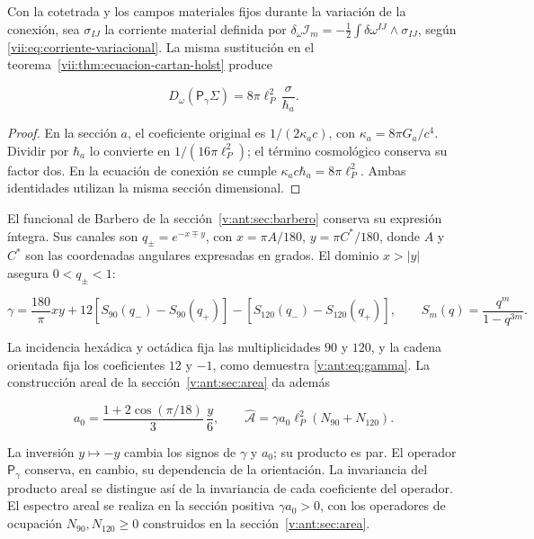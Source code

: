 Con la cotetrada y los campos materiales fijos durante la variación de la conexión, sea \(\sigma_{IJ}\) la corriente material definida por
\(\delta_\omega\mathcal I_m=-\tfrac12\int\delta\omega^{IJ}\wedge\sigma_{IJ}\), según \eqref{vii:eq:corriente-variacional}. La misma sustitución en el teorema~\ref{vii:thm:ecuacion-cartan-holst} produce



\begin{equation}
D_\omega(\mathsf P_\gamma\Sigma)
=8\pi\ell_P^2\,\frac{\sigma}{\hbar_a}.
\label{nuc12:eq:4.3}
\end{equation}



\begin{proof}
En la sección \(a\), el coeficiente original es \(1/(2\kappa_a c)\), con \(\kappa_a=8\pi G_a/c^4\). Dividir por \(\hbar_a\) lo convierte en \(1/(16\pi\ell_P^2)\); el término cosmológico conserva su factor dos. En la ecuación de conexión se cumple \(\kappa_a c\hbar_a=8\pi\ell_P^2\). Ambas identidades utilizan la misma sección dimensional.
\end{proof}

El funcional de Barbero de la sección~\ref{v:ant:sec:barbero} conserva su expresión íntegra. Sus canales son \(q_\pm=e^{-x\mp y}\), con \(x=\pi A/180\), \(y=\pi C^*/180\), donde \(A\) y \(C^*\) son las coordenadas angulares expresadas en grados. El dominio \(x>|y|\) asegura \(0<q_\pm<1\):



\begin{equation}
\gamma=\frac{180}{\pi}xy+
12[S_{90}(q_-)-S_{90}(q_+)]
-[S_{120}(q_-)-S_{120}(q_+)],\qquad
S_m(q)=\frac{q^m}{1-q^{3m}}.
\label{nuc12:eq:4.4}
\end{equation}



La incidencia hexádica y octádica fija las multiplicidades \(90\) y \(120\), y la cadena orientada fija los coeficientes \(12\) y \(-1\), como demuestra \eqref{v:ant:eq:gamma}. La construcción areal de la sección~\ref{v:ant:sec:area} da además



\begin{equation}
a_0=\frac{1+2\cos(\pi/18)}3\,\frac y6,\qquad
\widehat{\mathcal A}=\gamma a_0\ell_P^2(N_{90}+N_{120}).
\label{nuc12:eq:4.5}
\end{equation}



La inversión \(y\mapsto-y\) cambia los signos de \(\gamma\) y \(a_0\); su producto es par. El operador \(\mathsf P_\gamma\) conserva, en cambio, su dependencia de la orientación. La invariancia del producto areal se distingue así de la invariancia de cada coeficiente del operador. El espectro areal se realiza en la sección positiva \(\gamma a_0>0\), con los operadores de ocupación \(N_{90},N_{120}\geq0\) construidos en la sección~\ref{v:ant:sec:area}.

